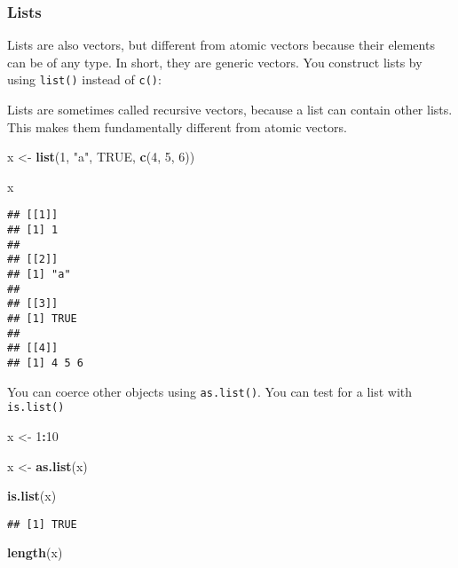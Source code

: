 \documentclass[
]{book}
\newenvironment{Shaded}{\begin{snugshade}}{\end{snugshade}}
\newcommand{\DecValTok}[1]{\textcolor[rgb]{0.00,0.00,0.81}{#1}}
\newcommand{\KeywordTok}[1]{\textcolor[rgb]{0.13,0.29,0.53}{\textbf{#1}}}
\newcommand{\NormalTok}[1]{#1}
\newcommand{\OperatorTok}[1]{\textcolor[rgb]{0.81,0.36,0.00}{\textbf{#1}}}
\newcommand{\OtherTok}[1]{\textcolor[rgb]{0.56,0.35,0.01}{#1}}
\newcommand{\StringTok}[1]{\textcolor[rgb]{0.31,0.60,0.02}{#1}}
\begin{document}
\hypertarget{lists}{%
\subsubsection{Lists}\label{lists}}

Lists are also vectors, but different from atomic vectors because their elements can be of any type. In short, they are generic vectors. You construct lists by using \texttt{list()} instead of \texttt{c()}:

Lists are sometimes called recursive vectors, because a list can contain other lists. This makes them fundamentally different from atomic vectors.

\begin{Shaded}
\begin{Highlighting}[]
\NormalTok{x \textless{}{-}}\StringTok{ }\KeywordTok{list}\NormalTok{(}\DecValTok{1}\NormalTok{, }\StringTok{"a"}\NormalTok{, }\OtherTok{TRUE}\NormalTok{, }\KeywordTok{c}\NormalTok{(}\DecValTok{4}\NormalTok{, }\DecValTok{5}\NormalTok{, }\DecValTok{6}\NormalTok{))}

\NormalTok{x}
\end{Highlighting}
\end{Shaded}

\begin{verbatim}
## [[1]]
## [1] 1
## 
## [[2]]
## [1] "a"
## 
## [[3]]
## [1] TRUE
## 
## [[4]]
## [1] 4 5 6
\end{verbatim}

You can coerce other objects using \texttt{as.list()}. You can test for a list with \texttt{is.list()}

\begin{Shaded}
\begin{Highlighting}[]
\NormalTok{x \textless{}{-}}\StringTok{ }\DecValTok{1}\OperatorTok{:}\DecValTok{10}

\NormalTok{x \textless{}{-}}\StringTok{ }\KeywordTok{as.list}\NormalTok{(x)}

\KeywordTok{is.list}\NormalTok{(x)}
\end{Highlighting}
\end{Shaded}

\begin{verbatim}
## [1] TRUE
\end{verbatim}

\begin{Shaded}
\begin{Highlighting}[]
\KeywordTok{length}\NormalTok{(x)}
\end{Highlighting}
\end{Shaded}
\end{document}
